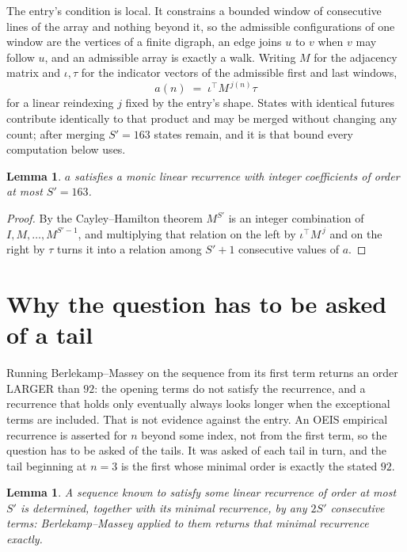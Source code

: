 \documentclass[11pt,a4paper]{article}
\theoremstyle{plain}
\newtheorem{lemma}[theorem]{Lemma}
\theoremstyle{definition}
\begin{document}
The entry's condition is local. It constrains a bounded window of consecutive lines of the
array and nothing beyond it, so the admissible configurations of one window are the vertices of
a finite digraph, an edge joins $u$ to $v$ when $v$ may follow $u$, and an admissible array is
exactly a walk. Writing $M$ for the adjacency matrix and $\iota,\tau$ for the indicator vectors
of the admissible first and last windows,
\[
a(n)\;=\;\iota^{\!\top}M^{\,j(n)}\tau
\]
for a linear reindexing $j$ fixed by the entry's shape. States with identical futures
contribute identically to that product and may be merged without changing any count; after
merging $S'=163$ states remain, and it is that bound every computation below uses.

\begin{lemma}\label{lem:cf}
$a$ satisfies a monic linear recurrence with integer coefficients of order at most $S'=163$.
\end{lemma}

\begin{proof}
By the Cayley--Hamilton theorem $M^{S'}$ is an integer combination of $I,M,\dots,M^{S'-1}$,
and multiplying that relation on the left by $\iota^{\!\top}M^{\,j}$ and on the right by
$\tau$ turns it into a relation among $S'+1$ consecutive values of $a$.
\end{proof}

\section{Why the question has to be asked of a tail}

Running Berlekamp--Massey on the sequence from its first term returns an order LARGER than $92$: the opening terms do not satisfy the recurrence, and a recurrence that holds only eventually always looks longer when the exceptional terms are included. That is not evidence against the entry. An OEIS empirical recurrence is asserted for $n$ beyond some index, not from the first term, so the question has to be asked of the tails. It was asked of each tail in turn, and the tail beginning at $n=3$ is the first whose minimal order is exactly the stated $92$.

\begin{lemma}\label{lem:bm}
A sequence known to satisfy some linear recurrence of order at most $S'$ is determined,
together with its minimal recurrence, by any $2S'$ consecutive terms: Berlekamp--Massey applied
to them returns that minimal recurrence exactly.
\end{lemma}
\end{document}

